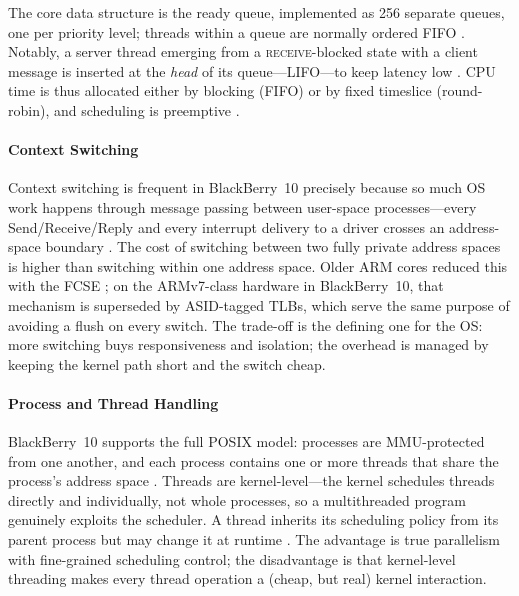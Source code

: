 The core data structure is the ready queue, implemented as 256 separate
queues, one per priority level; threads within a queue are normally
ordered FIFO \citep{qnx_kernel_sysarch}. Notably, a server thread
emerging from a \textsc{receive}-blocked state with a client message is
inserted at the \emph{head} of its queue---LIFO---to keep latency low
\citep{qnx_kernel_sysarch}. CPU time is thus allocated either by
blocking (FIFO) or by fixed timeslice (round-robin), and scheduling is
preemptive \citep{qnx_kernel_sysarch, qnx_sched_policies}.

\paragraph{Context Switching}

Context switching is frequent in BlackBerry~10 precisely because so much
OS work happens through message passing between user-space processes---every
Send/Receive/Reply and every interrupt delivery to a driver crosses an
address-space boundary \citep{qnx_arm_memory}. The cost of switching
between two fully private address spaces is higher than switching within
one address space. Older ARM cores reduced this with the FCSE
\citep{qnx_arm_memory}; on the ARMv7-class hardware in BlackBerry~10,
that mechanism is superseded by ASID-tagged TLBs, which serve the same
purpose of avoiding a flush on every switch. The trade-off is the
defining one for the OS: more switching buys responsiveness and
isolation; the overhead is managed by keeping the kernel path short and
the switch cheap.

\paragraph{Process and Thread Handling}

BlackBerry~10 supports the full POSIX model: processes are MMU-protected
from one another, and each process contains one or more threads that
share the process's address space \citep{qnx_kernel_sysarch}. Threads are
kernel-level---the kernel schedules threads directly and individually,
not whole processes, so a multithreaded program genuinely exploits the
scheduler. A thread inherits its scheduling policy from its parent
process but may change it at runtime \citep{qnx_kernel_sysarch,
qnx_sched_policies}. The advantage is true parallelism with fine-grained
scheduling control; the disadvantage is that kernel-level threading
makes every thread operation a (cheap, but real) kernel interaction.

